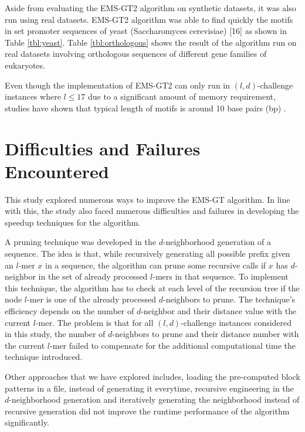 

Aside from evaluating the EMS-GT2 algorithm on synthetic datasets, it was also run using real datasets. EMS-GT2 algorithm was able to find quickly the motifs in set promoter sequences of yeast (Saccharomyces cerevisiae) [16] as shown in Table \ref{tbl:yeast}. Table \ref{tbl:orthologous} shows the result of the algorithm run on real datasets involving orthologous sequences of different gene families of eukaryotes.





Even though the implementation of EMS-GT2 can only run in $(l, d)$-challenge instances where $l \leq 17$ due to a significant amount of memory requirement, studies have shown that typical length of motifs is around 10 base pairs (bp) \cite{stewart2012transcription}.


\section{Difficulties and Failures Encountered}

This study explored numerous ways to improve the EMS-GT algorithm. In line with this, the study also faced numerous difficulties and failures in developing the speedup techniques for the algorithm.

A pruning technique was developed in the $d$-neighborhood generation of a sequence. The idea is that, while recursively generating all possible prefix given an $l$-mer $x$ in a sequence, the algorithm can prune some recursive calls if $x$ has $d$-neighbor in the set of already processed $l$-mers in that sequence. To implement this technique, the algorithm has to check at each level of the recursion tree if the node $l$-mer is one of the already processed $d$-neighbors to prune. The technique's efficiency depends on the number of $d$-neighbor and their distance value with the current $l$-mer. The problem is that for all $(l, d)$-challenge instances considered in this study, the number of $d$-neighbors to prune and their distance number with the current $l$-mer failed to compensate for the additional computational time the technique introduced.

Other approaches that we have explored includes, loading the pre-computed block patterns in a file, instead of generating it everytime, recursive engineering in the $d$-neighborhood generation and iteratively generating the neighborhood instead of recursive generation did not improve the runtime performance of the algorithm significantly.






